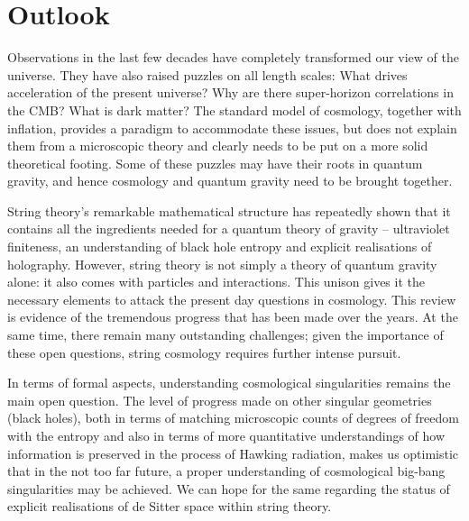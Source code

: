 \startdocument

\section{Outlook}

  Observations in the last few decades  have completely transformed our view of the universe. They  have also raised puzzles on 
  all length scales: What drives acceleration of the present universe? Why are there super-horizon correlations in the CMB? What is dark matter?  The standard model of cosmology, together with inflation, provides a paradigm to accommodate these issues, but does not explain them from a microscopic theory and clearly needs to be put on a more solid theoretical footing. Some of
 these puzzles may have their roots in quantum gravity, and hence cosmology and quantum gravity need to be brought together. 
 
 String theory's remarkable mathematical
 structure has repeatedly shown that it contains all the ingredients needed for a quantum theory of gravity --  ultraviolet finiteness, 
 an understanding of black hole entropy  and explicit realisations of holography. However, string theory is not simply a theory of quantum gravity alone: it also comes with particles
 and interactions. This unison gives it the necessary elements to attack the present day questions in cosmology.  This review
is evidence of the tremendous progress that has been made over the years. At the same time, there remain many outstanding challenges; given the importance of these open questions, string cosmology requires further intense pursuit. 
 
 In terms of formal aspects,  understanding cosmological singularities remains the main open question. The level of progress made on other singular geometries (black holes), both in terms of matching microscopic counts of degrees of freedom with the entropy and also in terms of more quantitative understandings of how information is preserved in the process of Hawking radiation, makes us  optimistic that in the not too far future, a proper understanding of cosmological big-bang singularities may be achieved. We can hope for the same regarding the status of explicit realisations of de Sitter space within string theory. 
 
